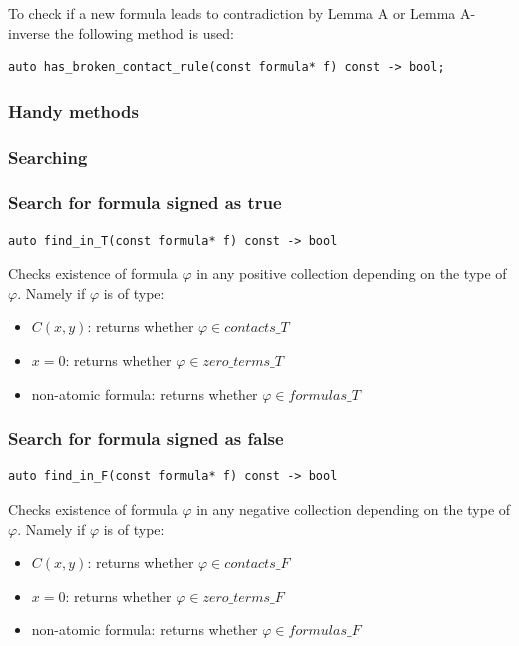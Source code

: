\documentclass{article}
\begin{document}
	To check if a new formula leads to contradiction by Lemma A or Lemma A-inverse the following method is used:

\begin{lstlisting}
auto has_broken_contact_rule(const formula* f) const -> bool;
\end{lstlisting}

	\subsubsection{Handy methods}
	\subsubsection*{Searching}
	\subsubsection*{Search for formula signed as true}
\begin{lstlisting}
auto find_in_T(const formula* f) const -> bool
\end{lstlisting}
	Checks existence of formula $\varphi$ in any positive collection depending on the type of $\varphi$. Namely if $\varphi$ is of type:
	\begin{itemize}
		\item $C(x, y)$: returns whether $\varphi \in contacts\_T$
		\item $x = 0$: returns whether $\varphi \in zero\_terms\_T$
		\item non-atomic formula: returns whether $\varphi \in formulas\_T$
	\end{itemize}

	\subsubsection*{Search for formula signed as false}
\begin{lstlisting}
auto find_in_F(const formula* f) const -> bool
\end{lstlisting}
	Checks existence of formula $\varphi$ in any negative collection depending on the type of $\varphi$. Namely if $\varphi$ is of type:
	\begin{itemize}
		\item $C(x, y)$: returns whether $\varphi \in contacts\_F$
		\item $x = 0$: returns whether $\varphi \in zero\_terms\_F$
		\item non-atomic formula: returns whether $\varphi \in formulas\_F$
	\end{itemize}
\end{document}
